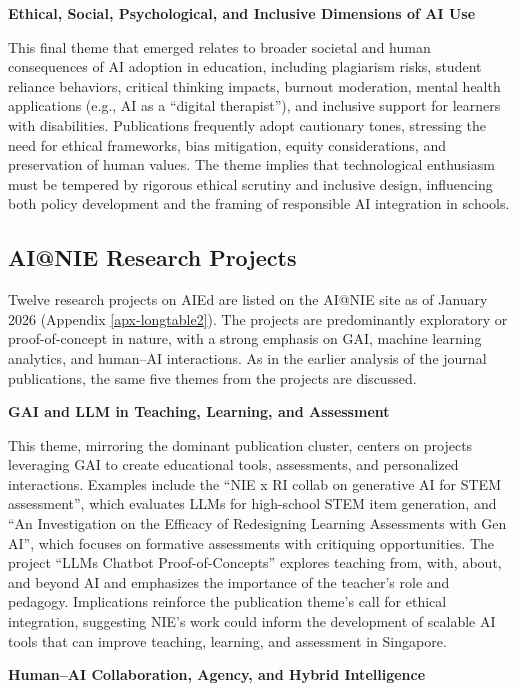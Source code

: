 \documentclass[english]{textolivre}
\begin{document}
\textbf{Ethical, Social, Psychological, and Inclusive Dimensions of AI Use}

    This final theme that emerged relates to broader societal and human consequences of AI adoption in education, including plagiarism risks, student reliance behaviors, critical thinking impacts, burnout moderation, mental health applications (e.g., AI as a “digital therapist”), and inclusive support for learners with disabilities. Publications frequently adopt cautionary tones, stressing the need for ethical frameworks, bias mitigation, equity considerations, and preservation of human values. The theme implies that technological enthusiasm must be tempered by rigorous ethical scrutiny and inclusive design, influencing both policy development and the framing of responsible AI integration in schools.

\subsection{AI@NIE Research Projects}\label{sec-organizacao}
Twelve research projects on AIEd are listed on the AI@NIE site as of January 2026 (Appendix \ref{apx-longtable2}). The projects are predominantly exploratory or proof-of-concept in nature, with a strong emphasis on GAI, machine learning analytics, and human–AI interactions. As in the earlier analysis of the journal publications, the same five themes from the projects are discussed.

\textbf{GAI and LLM in Teaching, Learning, and Assessment}

    This theme, mirroring the dominant publication cluster, centers on projects leveraging GAI to create educational tools, assessments, and personalized interactions. Examples include the “NIE x RI collab on generative AI for STEM assessment”, which evaluates LLMs for high-school STEM item generation, and “An Investigation on the Efficacy of Redesigning Learning Assessments with Gen AI”, which focuses on formative assessments with critiquing opportunities. The project “LLMs Chatbot Proof-of-Concepts” explores teaching from, with, about, and beyond AI and emphasizes the importance of the teacher’s role and pedagogy. Implications reinforce the publication theme’s call for ethical integration, suggesting NIE’s work could inform the development of scalable AI tools that can improve teaching, learning, and assessment in Singapore.

\textbf{Human–AI Collaboration, Agency, and Hybrid Intelligence}
\end{document}
